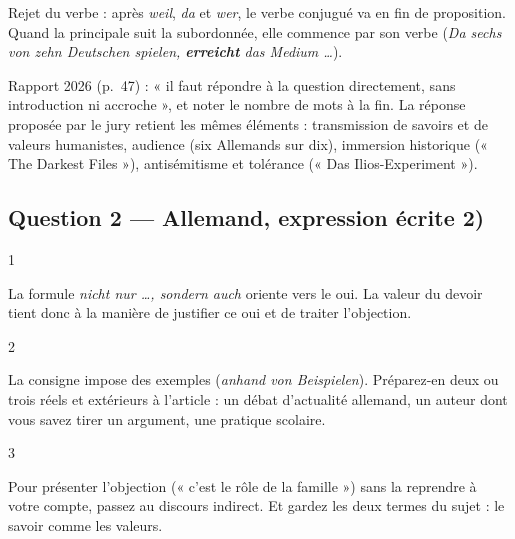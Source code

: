 \documentclass[11pt,a4paper]{article}
\begin{document}
\begin{methode}

Rejet du verbe : après \emph{weil}, \emph{da} et \emph{wer}, le verbe conjugué va en fin de proposition. Quand la principale suit la subordonnée, elle commence par son verbe (\emph{Da sechs von zehn Deutschen spielen, \textbf{erreicht} das Medium \ldots{}}).

\end{methode}

\begin{jury}

Rapport 2026 (p.~47) : « il faut répondre à la question directement, sans introduction ni accroche », et noter le nombre de mots à la fin. La réponse proposée par le jury retient les mêmes éléments : transmission de savoirs et de valeurs humanistes, audience (six Allemands sur dix), immersion historique (« The Darkest Files »), antisémitisme et tolérance (« Das Ilios-Experiment »).

\end{jury}

\hypertarget{question-2-allemand-expression-uxe9crite-2}{%
\subsection{Question 2 --- Allemand, expression écrite 2)}\label{question-2-allemand-expression-uxe9crite-2}}

\begin{indication}{1}

La formule \emph{nicht nur \ldots, sondern auch} oriente vers le oui. La valeur du devoir tient donc à la manière de justifier ce oui et de traiter l'objection.

\end{indication}

\begin{indication}{2}

La consigne impose des exemples (\emph{anhand von Beispielen}). Préparez-en deux ou trois réels et extérieurs à l'article : un débat d'actualité allemand, un auteur dont vous savez tirer un argument, une pratique scolaire.

\end{indication}

\begin{indication}{3}

Pour présenter l'objection (« c'est le rôle de la famille ») sans la reprendre à votre compte, passez au discours indirect. Et gardez les deux termes du sujet : le savoir comme les valeurs.

\end{indication}
\end{document}
